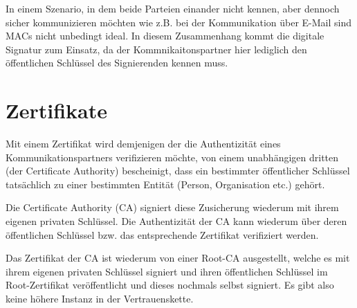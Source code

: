\documentclass[12pt.twoside,a4paper,notitlepage,parskip]{scrartcl}
\begin{document}
In einem Szenario, in dem beide Parteien einander nicht kennen, aber dennoch sicher kommunizieren möchten wie z.B. bei der Kommunikation über E-Mail sind MACs nicht unbedingt ideal. In diesem Zusammenhang kommt die digitale Signatur zum Einsatz, da der Kommnikaitonspartner hier lediglich den öffentlichen Schlüssel des Signierenden kennen muss. 


\section{Zertifikate}
Mit einem Zertifikat wird demjenigen der die Authentizität eines Kommunikationspartners verifizieren möchte, von einem unabhängigen dritten (der Certificate Authority)  bescheinigt, dass ein bestimmter öffentlicher Schlüssel tatsächlich zu einer bestimmten Entität (Person, Organisation etc.) gehört. 

Die Certificate Authority (CA) signiert diese Zusicherung wiederum mit ihrem eigenen privaten Schlüssel. Die Authentizität der CA kann wiederum über deren öffentlichen Schlüssel bzw. das entsprechende Zertifikat verifiziert werden. 

Das Zertifikat der CA ist wiederum von einer Root-CA ausgestellt, welche es mit ihrem eigenen privaten Schlüssel signiert und ihren öffentlichen Schlüssel im Root-Zertifikat veröffentlicht und dieses nochmals selbst signiert. Es gibt also keine höhere Instanz in der Vertrauenskette.
\end{document}
